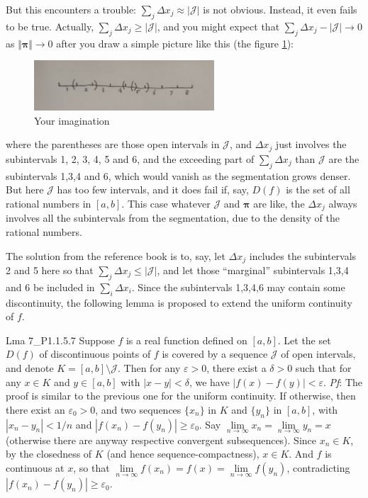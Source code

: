 \documentclass{article}
\begin{document}
But this encounters a trouble: $\sum_{j} \Delta x_j \approx |\mathcal{J}|$ is not obvious. Instead, it even fails to be true. Actually, $\sum_j \Delta x_j\geq|\mathcal{J}|$, and you might expect that $\sum_j \Delta x_j - |\mathcal{J}| \rightarrow 0$ as $\Vert\pmb{\pi}\Vert\to 0$ after you draw a simple picture like this (the figure \ref{fig:yours}):
\begin{figure}[H]
    \centering
    \includegraphics[width=0.6\textwidth]{figs_P1/1.jpg}
    \caption{Your imagination}
    \label{fig:yours}
\end{figure}
where the parentheses are those open intervals in $\mathcal{J}$, and $\Delta x_j$ just involves the subintervals 1, 2, 3, 4, 5 and 6, and the exceeding part of $\sum_j \Delta x_j$ than $\mathcal{J}$ are the subintervals 1,3,4 and 6, which would vanish as the segmentation grows denser. But here $\mathcal{J}$ has too few intervals, and it does fail if, say, $D(f)$ is the set of all rational numbers in $[a,b]$. This case whatever $\mathcal{J}$ and $\pmb{\pi}$ are like, the $\Delta x_j$ always involves all the subintervals from the segmentation, due to the density of the rational numbers.

The solution from the reference book is to, say, let $\Delta x_j$ includes the subintervals 2 and 5 here so that $\sum_j \Delta x_j \leq |\mathcal{J}|$, and let those ``marginal'' subintervals 1,3,4 and 6 be included in $\sum_i \Delta x_i$. Since the subintervals 1,3,4,6 may contain some discontinuity, the following lemma is proposed to extend the uniform continuity of $f$.

\begin{Th}{Lma 7\_P1.1.5.7}
    Suppose $f$ is a real function defined on $[a,b]$. Let the set $D(f)$ of discontinuous points of $f$ is covered by a sequence $\mathcal{J}$ of open intervals, and denote $K = [a,b]\setminus \mathcal{J}$. Then for any $\varepsilon > 0$, there exist a $\delta > 0$ such that for any $x\in K$ and $y\in [a,b]$ with $|x-y|<\delta$, we have $|f(x)-f(y)|<\varepsilon$.
    \tcblower
    \textit{Pf}: The proof is similar to the previous one for the uniform continuity. If otherwise, then there exist an $\varepsilon_0 > 0$, and two sequences $\{x_n\}$ in $K$ and $\{y_n\}$ in $[a,b]$, with $|x_n-y_n|<1/n$ and $|f(x_n)-f(y_n)|\geq \varepsilon_0$. Say $\lim\limits_{n\to\infty} x_n = \lim\limits_{n\to\infty} y_n = x$ (otherwise there are anyway respective convergent subsequences). Since $x_n\in K$, by the closedness of $K$ (and hence sequence-compactness), $x\in K$. And $f$ is continuous at $x$, so that $\lim\limits_{n\to\infty} f(x_n) = f(x) = \lim\limits_{n\to\infty} f(y_n)$, contradicting $|f(x_n)-f(y_n)|\geq \varepsilon_0$.
\end{Th}
\end{document}
